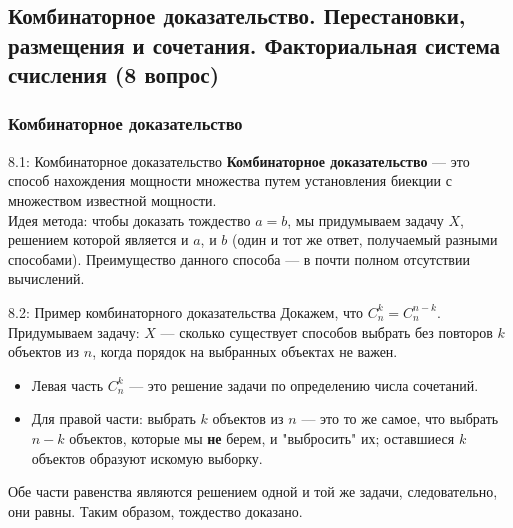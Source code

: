 \documentclass[a4paper,12pt]{article}
\begin{document}
	\subsection{Комбинаторное доказательство. Перестановки, размещения и сочетания. Факториальная система счисления (8 вопрос)}
	
	\subsubsection{Комбинаторное доказательство}
	
	\begin{definitionbox}{8.1: Комбинаторное доказательство}
		\textbf{Комбинаторное доказательство} — это способ нахождения мощности множества путем установления биекции с множеством известной мощности.\\
		
		Идея метода: чтобы доказать тождество $a = b$, мы придумываем задачу $X$, решением которой является и $a$, и $b$ (один и тот же ответ, получаемый разными способами). Преимущество данного способа — в почти полном отсутствии вычислений.
	\end{definitionbox}
	
	\begin{examplebox}{8.2: Пример комбинаторного доказательства}
		Докажем, что $C_n^k = C_n^{n-k}$.\\
		
		Придумываем задачу: $X$ — сколько существует способов выбрать без повторов $k$ объектов из $n$, когда порядок на выбранных объектах не важен.
		
		\begin{itemize}
			\item Левая часть $C_n^k$ — это решение задачи по определению числа сочетаний.
			\item Для правой части: выбрать $k$ объектов из $n$ — это то же самое, что выбрать $n-k$ объектов, которые мы \textbf{не} берем, и "выбросить" их; оставшиеся $k$ объектов образуют искомую выборку.
		\end{itemize}
		
		Обе части равенства являются решением одной и той же задачи, следовательно, они равны. Таким образом, тождество доказано.
	\end{examplebox}
	
\end{document}
